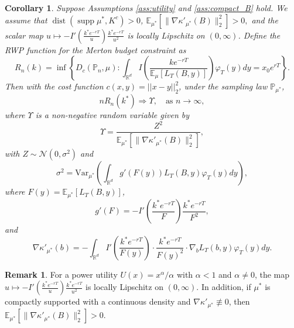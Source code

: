 \documentclass[11pt]{article}
\newtheorem{corollary}{Corollary}
\theoremstyle{definition}
\newtheorem{remark}{Remark}
\newcommand{\R}{\mathbb{R}}
\newcommand{\var}{\text{Var}}
\newcommand{\E}{\mathbb{E}}
\begin{document}
\begin{corollary}\label{Coro2}
Suppose Assumptions \ref{ass:utility} and \ref{ass:compact_B} hold. {We assume that $\operatorname{dist}(\operatorname{supp}\mu^*,K^c)>0$, $\E_{\mu^*}\!\left[\|\nabla \kappa'_{\mu^*}(B)\|_2^2\right] > 0,$
and the scalar map $u \mapsto -I'\!\left(\frac{k^*e^{-rT}}{u}\right)\frac{k^*e^{-rT}}{u^2}$ is locally Lipschitz on $(0,\infty)$.} Define the RWP function for the Merton budget constraint as
$$
R_n(k) = \inf \left\{ D_c(\mathbb{P}_n, \mu) : \int_{\R^{d}} I\left( \frac{k e^{-rT}}{\E_{\mu}[L_T(B, y)]} \right) \varphi_T(y)  dy = x_0 e^{rT} \right\}.
$$ Then with the cost function $c(x,y) = ||x-y||_2^2$, {under the sampling law \(\mathbb P_{\mu^*}\),}
$$
n R_n(k^*) \Rightarrow \Upsilon, \quad \text{as } n \to \infty,
$$
where $\Upsilon$ is a non-negative random variable given by
\begin{equation}\label{preL}
\Upsilon = \frac{Z^2}{\E_{\mu^*}[\|\nabla \kappa'_{\mu^*}(B)\|_2^2]},    
\end{equation}
with $Z \sim \mathcal{N}(0, \sigma^2)$ and
\begin{equation}\label{sigma}
\sigma^2 = \var_{\mu^*}\left( \int_{\R^d} g'(F(y)) L_T(B, y) \varphi_T(y) dy \right),    
\end{equation}
where $F(y) = \E_{\mu^*}[L_T(B, y)]$,
\[
g'(F) = -I'\!\left( \frac{k^* e^{-rT}}{F} \right) \frac{k^* e^{-rT}}{F^2},
\]and $$\nabla \kappa'_{ \mu^*}(b) = -\int_{\R^d} I'\left( \frac{k^* e^{-rT}}{F(y)} \right) \cdot \frac{k^* e^{-rT}}{F(y)^2} \cdot \nabla_b L_T(b, y) \varphi_T(y) dy.$$

\end{corollary}

{\begin{remark}
For a power utility $U(x)=x^\alpha/\alpha$ with $\alpha<1$ and $\alpha\neq 0$, the map $u \mapsto -I'\!\left(\frac{k^*e^{-rT}}{u}\right)\frac{k^*e^{-rT}}{u^2}$
is locally Lipschitz on $(0,\infty)$. In addition, if $\mu^*$ is compactly supported with a continuous density and $\nabla \kappa'_{\mu^*}\not\equiv 0$, then $\E_{\mu^*}\!\left[\|\nabla \kappa'_{\mu^*}(B)\|_2^2\right] > 0.$
\end{remark}}
\end{document}
